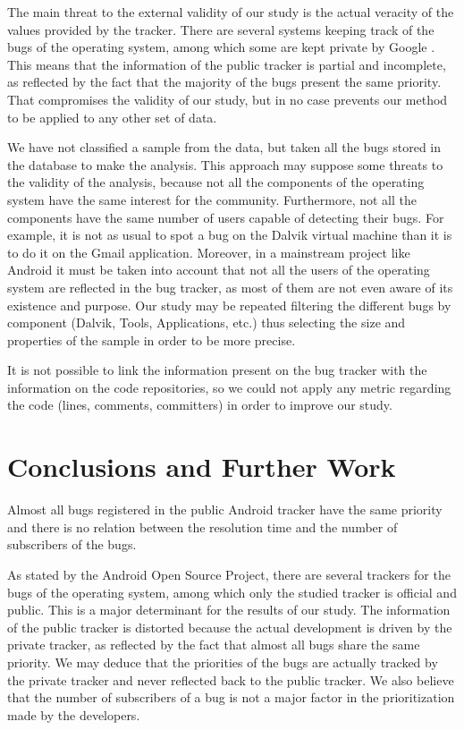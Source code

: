 \documentclass[10pt, conference, compsocconf]{IEEEtran}
\begin{document}
The main threat to the external validity of our study is the actual veracity of the values provided by the tracker. There are several systems keeping track of the bugs of the operating system, among which some are kept private by Google \cite{LifeBug}. This means that the information of the public tracker is partial and incomplete, as reflected by the fact that the majority of the bugs present the same priority. That compromises the validity of our study, but in no case prevents our method to be applied to any other set of data.

We have not classified a sample from the data, but taken all the bugs stored in the database to make the analysis. This approach may suppose some threats to the validity of the analysis, because not all the components of the operating system have the same interest for the community. Furthermore, not all the components have the same number of users capable of detecting their bugs. For example, it is not as usual to spot a bug on the Dalvik virtual machine than it is to do it on the Gmail application. Moreover, in a mainstream project like Android it must be taken into account that not all the users of the operating system are reflected in the bug tracker, as most of them are not even aware of its existence and purpose. Our study may be repeated filtering the different bugs by component (Dalvik, Tools, Applications, etc.) thus selecting the size and properties of the sample in order to be more precise.

It is not possible to link the information present on the bug tracker with the information on the code repositories, so we could not apply any metric regarding the code (lines, comments, committers) in order to improve our study.


\section{Conclusions and Further Work}
Almost all bugs registered in the public Android tracker have the same priority and there is no relation between the resolution time and the number of subscribers of the bugs.

As stated by the Android Open Source Project, there are several trackers for the bugs of the operating system, among which only the studied tracker is official and public. This is a major determinant for the results of our study. The information of the public tracker is distorted because the actual development is driven by the private tracker, as reflected by the fact that almost all bugs share the same priority. We may deduce that the priorities of the bugs are actually tracked by the private tracker and never reflected back to the public tracker. We also believe that the number of subscribers of a bug is not a major factor in the prioritization made by the developers.
\end{document}

